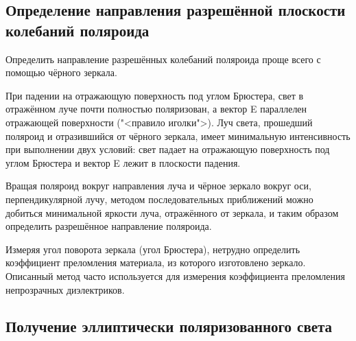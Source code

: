\documentclass[a4paper]{article}
\begin{document}
\subsection{Определение направления разрешённой плоскости колебаний поляроида}
Определить направление разрешённых колебаний поляроида проще всего с помощью чёрного зеркала.
	
При падении на отражающую поверхность под углом Брюстера, свет в отражённом луче почти полностью поляризован, а вектор E параллелен отражающей поверхности ("<правило иголки">). Луч света, прошедший поляроид и отразившийся от чёрного зеркала, имеет минимальную интенсивность при выполнении двух условий: свет падает на отражающую поверхность под углом Брюстера и вектор E лежит в плоскости падения.

Вращая поляроид вокруг направления луча и чёрное зеркало вокруг оси, перпендикулярной лучу, методом последовательных приближений можно добиться минимальной яркости луча, отражённого от зеркала, и таким образом определить разрешённое направление поляроида.

Измеряя угол поворота зеркала (угол Брюстера), нетрудно определить коэффициент преломления материала, из которого изготовлено зеркало. Описанный метод часто используется для измерения коэффициента преломления непрозрачных диэлектриков.

\subsection{Получение эллиптически поляризованного света}
\end{document}

